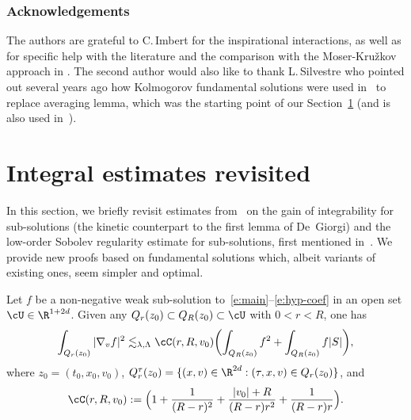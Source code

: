 \subsubsection*{Acknowledgements} The authors are grateful to
C.\,Imbert for the inspirational interactions, as well as for
specific help with the literature and the comparison with the
Moser-Kru\v{z}kov approach in \cite{Guerand-Imbert}. The second
author would also like to thank L.\,Silvestre who pointed out
several years ago how Kolmogorov fundamental solutions were used
in~\cite{pp} to replace averaging lemma, which was the starting
point of our Section~\ref{sec:int} (and is also used
in~\cite{MR4049224}).


\section{Integral estimates revisited}
\label{sec:int}

In this section, we briefly revisit estimates from~\cite{pp,gimv}
on the gain of inte\-grability for sub-solutions (the kinetic
counterpart to the first lemma of De~Giorgi) and the low-order
Sobolev regularity estimate for sub-solutions, first mentioned
in~\cite{gimv}. We provide new proofs based on fundamental
solutions which, albeit variants of existing ones, seem simpler
and optimal.


\begin{proposition}
\label{prop:EE}
Let $f$ be a non-negative weak sub-solution
to~\eqref{e:main}--\eqref{e:hyp-coef} in an open set
$\cU \in \R^{1+2d}$. Given any
$Q_r(z_0) \subset Q_R(z_0) \subset \cU$ with $0<r<R$, one has
\begin{align*}
\int_{Q_r(z_0)} |\nabla_v f|^2
\lesssim_{\lambda,\Lambda} \cC(r,R,v_0) \biggl(
\int_{Q_R(z_0)} f^2 + \int_{Q_R(z_0)} f |S| \biggr),
\end{align*}
where $z_0=(t_0,x_0,v_0)$,
$Q_r^\tau (z_0) = \{(x,v)\in\R^{2d} :(\tau,x,v)\in
Q_r(z_0) \} $, and
\begin{equation}
\label{eq:C}
\cC(r,R,v_0) := \Bigl( 1 + \frac{1}{(R-r)^2} +
\frac{|v_0|+R}{(R-r)r^2} +\frac{1}{(R-r)r} \Bigr).
\end{equation}
\end{proposition}

